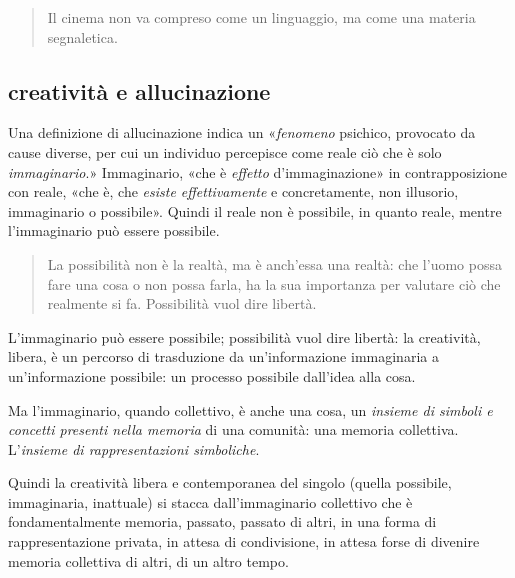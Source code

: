\documentclass{../../lib/gs}
\begin{document}
\begin{quote}
\begin{sf}
\small
  Il cinema non va compreso come un linguaggio, ma come una materia segnaletica.
  \cite{deleuze2009}
  \end{sf}
\end{quote}


\subsection{creatività e allucinazione}

Una definizione di allucinazione indica un «\emph{fenomeno} psichico,
provocato da cause diverse, per cui un individuo percepisce come reale ciò che
è solo \emph{immaginario}.» Immaginario, «che è \emph{effetto} d'immaginazione»
in contrapposizione con reale, «che è, che \emph{esiste effettivamente} e
concretamente, non illusorio, immaginario o possibile». Quindi il reale non è
possibile, in quanto reale, mentre l'immaginario può essere possibile.

\begin{quote}
  La possibilità non è la realtà, ma è anch'essa una realtà: che l'uomo possa
  fare una cosa o non possa farla, ha la sua importanza per valutare ciò che
  realmente si fa. Possibilità vuol dire libertà. \cite{ag:matst}
\end{quote}%

L'immaginario può essere possibile; possibilità vuol dire libertà: la creatività,
libera, è un percorso di trasduzione da un'informazione immaginaria a
un'informazione possibile: un processo possibile dall'idea alla cosa.

Ma l'immaginario, quando collettivo, è anche una cosa, un \emph{insieme di
simboli e concetti presenti nella memoria} di una comunità: una memoria
collettiva. L'\emph{insieme di rappresentazioni simboliche}.

Quindi la creatività libera e contemporanea \cite{agamben2008che} del singolo
(quella possibile, immaginaria, inattuale) si stacca dall'immaginario collettivo
che è fondamentalmente memoria, passato, passato di altri, in una forma di
rappresentazione privata, in attesa di condivisione, in attesa forse di divenire
memoria collettiva di altri, di un altro tempo.
\end{document}
